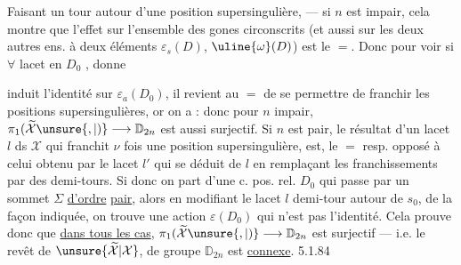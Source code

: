 Faisant un   tour 
autour d'une position supersingulière,
   --- si $n$ est 
impair, cela montre que l'effet sur
l'ensemble   des gones
circonscrits (et aussi sur les deux autres
ens. à deux éléments $\varepsilon_s(D)$, $\uline{\omega}(D)$)
est le $=$.  Donc pour voir si $\forall$
lacet en $D_0$ , donne 

induit l'identité sur $\varepsilon_a(D_0)$, il revient au
$=$ de se permettre de franchir les
positions supersingulières, or on a :
donc pour $n$ impair, $\pi_1(\widetilde{\mathcal X}\unsure{,|)}\longrightarrow\mathbb D_{2n}$
est aussi surjectif. Si $n$ est
pair, le résultat  d'un lacet $l$
 ds $\mathcal X$ qui franchit
$\nu$ fois une position supersingulière,
est,  le $=$ resp. opposé à celui obtenu
par le lacet $l'$ qui se déduit de
$l$ en remplaçant les franchissements
par des demi-tours. Si donc on
 part d'une c. pos. rel. $D_0$ qui
passe par un sommet  $\Sigma$ \uline{d'ordre}
\uline{pair}, alors en modifiant le lacet $l$
demi-tour  autour de $s_0$, de la
façon indiquée, on trouve une
 action  $\varepsilon(D_0)$ qui n'est
pas l'identité. Cela prouve donc que
\uline{dans tous les cas}, $\pi_1(\widetilde{\mathcal X}\unsure{,|)}\longrightarrow\mathbb D_{2n}$ est
surjectif --- i.e. le revêt  de $\unsure{\widetilde{\mathcal X}|\mathcal X}$, de groupe
$\mathbb D_{2n}$ est \uline{connexe}.
5.1.84

